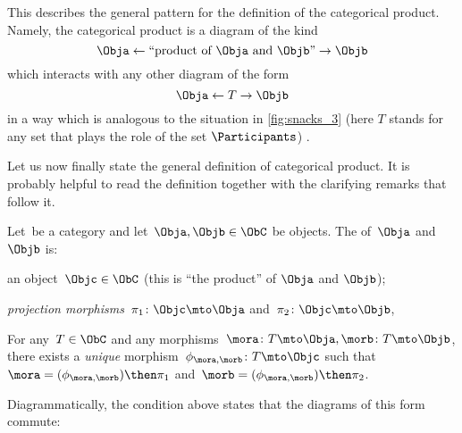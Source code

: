 This describes the general pattern for the definition of the categorical product. Namely, the categorical product is a diagram of the kind 
\begin{equation}\label{eq:prod-inline-generic-diagram}
\Obja \leftarrow \text{``product of } \Obja \text{ and } \Objb \text{''}  \rightarrow \Objb
\end{equation}
which interacts with any other diagram of the form 
\begin{equation}\label{eq:prod-inline-test-diagram}
\Obja \leftarrow T \rightarrow \Objb
\end{equation}
in a way which is analogous to the situation in \cref{fig:snacks_3} (here $T$ stands for any set that plays the role of the set $\Participants$) . 

Let us now finally state the general definition of categorical product. It is probably helpful to read the definition together with the clarifying remarks that follow it.



\begin{ctdefinition}\label{def:categorical-product}
  \label{def:categorical-product}
  Let~\CatC be a category and let~$\Obja, \Objb \in \ObC$ be objects. The \emph{} of~$\Obja$ and~$\Objb$ is: \\ 
  \constit
  \begin{compactenum}
    \item an object~$\Objc \in \ObC$ (this is ``the product'' of $\Obja$  and $\Objb$);
    \item \emph{projection morphisms}~$\pi_1 \colon \Objc \mto \Obja$ and~$\pi_2 \colon \Objc \mto \Objb$,
  \end{compactenum}
  \condit
  \begin{compactenum}
    \item For any~$T \in \ObC$ and any morphisms~$\mora \colon T \mto \Obja, \morb \colon T \mto \Objb$, there exists a \emph{unique} morphism~$\phi_{\mora,\morb} \colon T \mto \Objc$ such that~$\mora = (\phi_{\mora,
      \morb})\then \pi_1$ and~$\morb=(\phi_{\mora, \morb})\then \pi_2$.
  \end{compactenum}
\end{ctdefinition}

\begin{remark}\label{re:prod-comm-diag}
  Diagrammatically, the condition above states that the diagrams of this form commute:
  \begin{figure}[h!]
  \end{figure}
  \label{fig:prod-def-diagram}
\end{remark}

